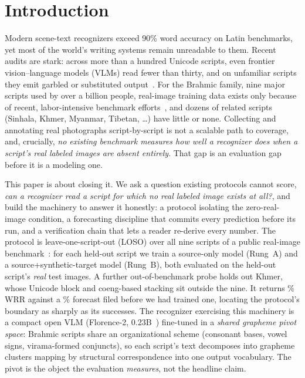 \section{Introduction}
\label{sec:intro}

Modern scene-text recognizers exceed 90\% word accuracy on Latin benchmarks, yet most of the
world's writing systems remain unreadable to them. Recent audits are stark: across more than a
hundred Unicode scripts, even frontier vision--language models (VLMs) read fewer than thirty, and
on unfamiliar scripts they emit garbled or substituted output~\cite{glotocr}. For the Brahmic
family, nine major scripts used by over a billion people, real-image training data exists
only because of recent, labor-intensive benchmark efforts~\cite{indicstr12,bstd}, and dozens of
related scripts (Sinhala, Khmer, Myanmar, Tibetan, \dots) have little or none. Collecting and
annotating real photographs script-by-script is not a scalable path to coverage, and, crucially,
\emph{no existing benchmark measures how well a recognizer does when a script's real labeled images
are absent entirely}. That gap is an evaluation gap before it is a modeling one.

This paper is about closing it. We ask a question existing protocols cannot score, \emph{can a
recognizer read a script for which no real labeled image exists at all?}, and build the
machinery to answer it honestly: a protocol isolating the zero-real-image condition, a forecasting
discipline that commits every prediction before its run, and a verification chain that lets a
reader re-derive every number. The protocol is leave-one-script-out (LOSO) over all nine scripts of
a public real-image benchmark~\cite{bstd}: for each held-out script we train a source-only model
(Rung~A) and a source+synthetic-target model (Rung~B), both evaluated on the held-out script's
\emph{real} test images. A further out-of-benchmark probe holds out Khmer, whose Unicode block and
coeng-based stacking sit outside the nine. It returns \khmerB\% WRR against a \khmerPred\% forecast
filed before we had trained one, locating the protocol's boundary as sharply as its
successes. The recognizer exercising this machinery is a compact open VLM (Florence-2,
0.23B~\cite{florence2}) fine-tuned in a \emph{shared grapheme pivot space}: Brahmic scripts share
an organizational scheme (consonant bases, vowel signs, virama-formed conjuncts), so each script's
text decomposes into grapheme clusters mapping by structural correspondence into one output
vocabulary. The pivot is the object the evaluation \emph{measures}, not the headline claim.

